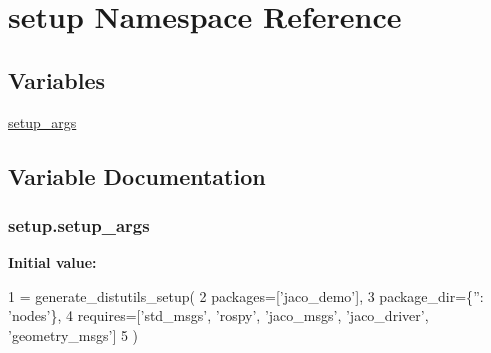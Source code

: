 \hypertarget{namespacesetup}{}\section{setup Namespace Reference}
\label{namespacesetup}
\subsection*{Variables}
\begin{DoxyCompactItemize}
\item 
\hyperlink{namespacesetup_a504ffa482edfe0eff08f64b2f5dff0e9}{setup\+\_\+args}
\end{DoxyCompactItemize}


\subsection{Variable Documentation}
\subsubsection[{\texorpdfstring{setup\+\_\+args}{setup_args}}]{\setlength{\rightskip}{0pt plus 5cm}setup.\+setup\+\_\+args}\hypertarget{namespacesetup_a504ffa482edfe0eff08f64b2f5dff0e9}{}\label{namespacesetup_a504ffa482edfe0eff08f64b2f5dff0e9}
{\bfseries Initial value\+:}
\begin{DoxyCode}
1 = generate\_distutils\_setup(
2     packages=[\textcolor{stringliteral}{'jaco\_demo'}],
3     package\_dir=\{\textcolor{stringliteral}{''}: \textcolor{stringliteral}{'nodes'}\},
4     requires=[\textcolor{stringliteral}{'std\_msgs'}, \textcolor{stringliteral}{'rospy'}, \textcolor{stringliteral}{'jaco\_msgs'}, \textcolor{stringliteral}{'jaco\_driver'}, \textcolor{stringliteral}{'geometry\_msgs'}]
5 )
\end{DoxyCode}
